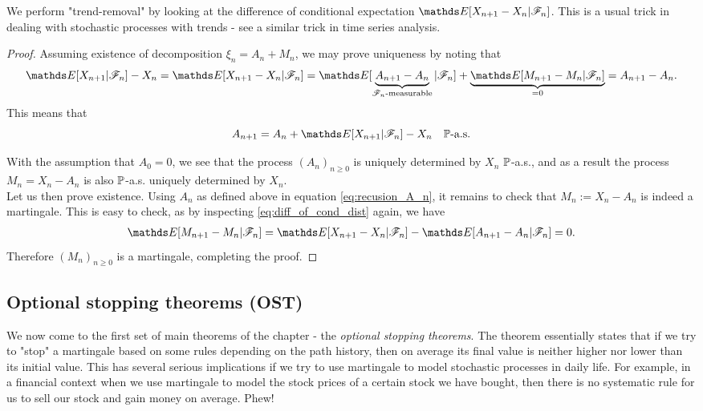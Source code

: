 \begin{hint}
We perform "trend-removal" by looking at the difference of conditional expectation $\E[X_{n+1}-X_n|\F_n]$. This is a usual trick in dealing with stochastic processes with trends - see a similar trick in time series analysis.
\end{hint}

\begin{proof}
Assuming existence of decomposition $\xi_n = A_n + M_n$, we may prove uniqueness by noting that
\begin{align} \label{eq:diff_of_cond_dist}
    \E[X_{n+1}|\F_n] - X_n = \E[X_{n+1}-X_n|\F_n] = \E[\underbrace{A_{n+1}-A_n}_{\F_n\text{-measurable}}|\F_n] + \underbrace{\E[M_{n+1}-M_n|\F_n]}_{=0} = A_{n+1} - A_n.
\end{align}
This means that 
\begin{equation} \label{eq:recusion_A_n}
    A_{n+1} = A_n + \E[X_{n+1}|\F_n] - X_n \quad \p\text{-a.s.}
\end{equation}

With the assumption that $A_0 = 0$, we see that the process $(A_n)_{n\geq 0}$ is uniquely determined by $X_n$ $\mathbb{P}$-a.s., and as a result the process $M_n = X_n - A_n$ is also $\mathbb{P}$-a.s. uniquely determined by $X_n$. \\

Let us then prove existence. Using $A_n$ as defined above in equation \eqref{eq:recusion_A_n}, it remains to check that $M_n := X_n - A_n$ is indeed a martingale. This is easy to check, as by inspecting \eqref{eq:diff_of_cond_dist} again, we have 
\begin{align*}
    \E[M_{n+1} - M_n | \F_n] = \E[X_{n+1} - X_n | \F_n] - \E[A_{n+1} - A_n | \F_n] = 0.
\end{align*}
Therefore $(M_n)_{n\geq 0}$ is a martingale, completing the proof.
\end{proof}

\subsection{Optional stopping theorems (OST)}
We now come to the first set of main theorems of the chapter - the \textit{optional stopping theorems}. The theorem essentially states that if we try to "stop" a martingale based on some rules depending on the path history, then on average its final value is neither higher nor lower than its initial value. This has several serious implications if we try to use martingale to model stochastic processes in daily life. For example, in a financial context when we use martingale to model the stock prices of a certain stock we have bought, then there is no systematic rule for us to sell our stock and gain money on average. Phew!

